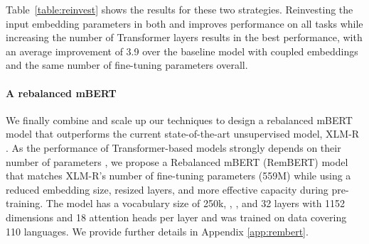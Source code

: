 \documentclass{article} \usepackage{iclr2021_conference,times}
\newcommand{\xtreme}{\textsc{xtreme}\xspace}
\begin{document}
Table~\ref{table:reinvest} shows the results for these two strategies. Reinvesting the input embedding parameters in both  and  improves performance on all tasks while increasing the number of Transformer layers  results in the best performance, with an average improvement of 3.9 over the baseline model with coupled embeddings and the same number of fine-tuning parameters overall.






\begin{table*}[t]
\caption{Effect of reinvesting the input embedding parameters to increase the hidden dimension  and number  of Transformer layers on \xtreme tasks.   model is included for an ablation study.}
\label{table:reinvest}
\begin{center}
\end{center}
\end{table*}









\paragraph{A rebalanced mBERT} We finally combine and scale up our techniques to design a rebalanced mBERT model that outperforms the current state-of-the-art unsupervised model, XLM-R \citep{Conneau2020}.
As the performance of Transformer-based models strongly depends on their number of parameters \citep{Raffel2020}, we propose a Rebalanced mBERT (RemBERT) model that matches XLM-R's number of fine-tuning parameters (559M) while using a reduced embedding size, resized layers, and more effective capacity during pre-training. The model has a vocabulary size of 250k, , , and 32 layers with 1152 dimensions and 18 attention heads per layer and was trained on data covering 110 languages. We provide further details in Appendix \ref{app:rembert}.
\end{document}
